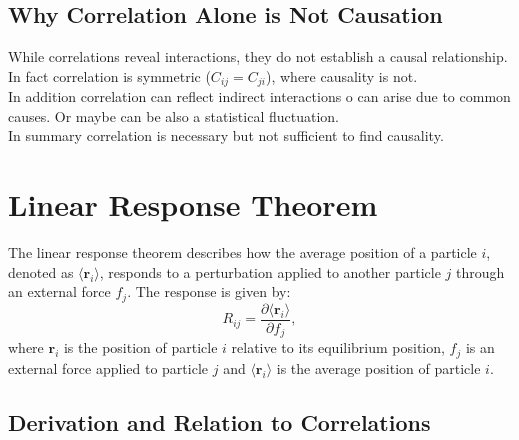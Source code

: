\documentclass[English, Lau, oneside]{sapthesis}
\begin{document}
\subsection{Why Correlation Alone is Not Causation}
\noindent While correlations reveal interactions, they do not establish a causal relationship.\\
In fact correlation is symmetric (\( C_{ij} = C_{ji} \)), where causality is not. \\
In addition correlation can reflect indirect interactions o can arise due to common causes. Or maybe can be also a statistical fluctuation.\\
In summary correlation is necessary but not sufficient to find causality.

\section{Linear Response Theorem}

\noindent The linear response theorem describes how the average position of a particle $i$, denoted as $\langle \mathbf{r}_i \rangle$, responds to a perturbation applied to another particle $j$ through an external force $f_j$. The response is given by:
\begin{equation}
R_{ij} = \frac{\partial \langle \mathbf{r}_i \rangle}{\partial f_j},
\end{equation}
where  $\mathbf{r}_i$ is the position of particle $i$ relative to its equilibrium position, $f_j$ is an external force applied to particle $j$ and $\langle \mathbf{r}_i \rangle$ is the average position of particle $i$.


\subsection{Derivation and Relation to Correlations}
\end{document}
